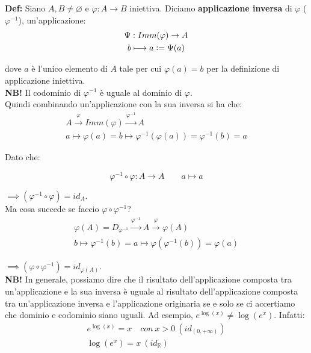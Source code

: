 \documentclass{article}
\begin{document}
\noindent\textbf{Def:} Siano $A, B \neq \varnothing$ e $\varphi: A \xrightarrow{} B$ iniettiva. Diciamo \textbf{applicazione inversa} di $\varphi$ ($\varphi^{-1}$), un'applicazione:
\begin{gather*}
    \Psi: Imm(\varphi) \xrightarrow{} A\\
    b \longmapsto a \vcentcolon = \Psi(a)
\end{gather*}

\noindent dove $a$ è l'unico elemento di $A$ tale per cui $\varphi(a) = b$ per la definizione di applicazione iniettiva.\\

\noindent\textbf{NB!} Il codominio di $\varphi^{-1}$ è uguale al dominio di $\varphi$.\\

\noindent Quindi combinando un'applicazione con la sua inversa si ha che:
\begin{gather*}
    A \overset{\varphi}{\longrightarrow} Imm(\varphi) \overset{\varphi^{-1}}{\longrightarrow} A\\
    a \longmapsto \varphi(a) = b \longmapsto \varphi^{-1}(\varphi(a)) = \varphi^{-1}(b) = a
\end{gather*}

\noindent Dato che: 

\begin{equation*}
    \varphi^{-1} \circ \varphi: A \xrightarrow{} A \qquad a \longmapsto a
\end{equation*}

\noindent $\implies (\varphi^{-1} \circ \varphi) = id_A$.\\

\noindent Ma cosa succede se faccio $\varphi \circ \varphi^{-1}$?
\begin{gather*}
    \varphi(A) = D_{\varphi^{-1}} \overset{\varphi^{-1}}{\longrightarrow} A \overset{\varphi}{\longrightarrow} \varphi(A)\\
    b \longmapsto \varphi^{-1} (b) = a \longmapsto \varphi(\varphi^{-1}(b)) = \varphi(a)
\end{gather*}

\noindent $\implies (\varphi \circ \varphi^{-1}) = id_{\varphi(A)}$.\\

\noindent\textbf{NB!} In generale, possiamo dire che il risultato dell'applicazione composta tra un'applicazione e la sua inversa è uguale al risultato dell'applicazione composta tra un'applicazione inversa e l'applicazione originaria se e solo se ci accertiamo che dominio e codominio siano uguali. Ad esempio, $e^{\log(x)} \neq \log(e^x)$. Infatti:
\begin{gather*}
    e^{\log(x)} = x \quad con \ x > 0 \ (id_{(0, +\infty)})\\
    \log(e^x) = x \ (id_\mathbb{R})
\end{gather*}
\end{document}
